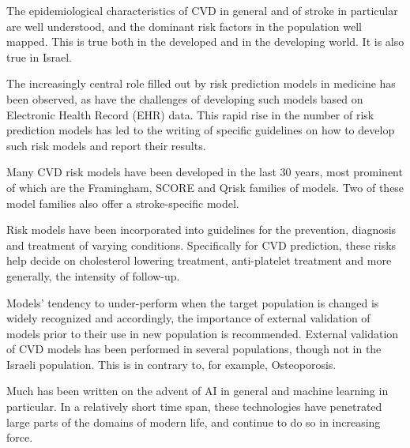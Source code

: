\documentclass[a4paper,12pt]{article}
\begin{document}
	The epidemiological characteristics of CVD in general and of stroke in particular are well understood\cite{Koton2014,Vangen-Loenne2017}, and the dominant risk factors in the population well mapped\cite{Yusuf2004,ODonnell2016}. This is true both in the developed and in the developing world\cite{Lozano2012}. It is also true in Israel\cite{ICDC2017}.
	
	The increasingly central role filled out by risk prediction models in medicine has been observed\cite{Moons2009}, as have the challenges of developing such models based on Electronic Health Record (EHR) data\cite{Goldstein2016,Goldstein2017}. This rapid rise in the number of risk prediction models has led to the writing of specific guidelines on how to develop such risk models and report their results\cite{Collins2015}.
	
	Many CVD risk models have been developed in the last 30 years, most prominent of which are the Framingham\cite{Wilson1998,NationalCholesterolEducationProgramNCEPExpertPanelonDetection2002,DAgostino2008,Goff2014}, SCORE\cite{Conroy2003} and Qrisk\cite{Hippisley-Cox2007,Hippisley-Cox2008} families of models.	Two of these model families also offer a stroke-specific model\cite{Wolf1991,DAgostino1994,Hippisley-Cox2013}.
	
	Risk models have been incorporated into guidelines for the prevention, diagnosis and treatment of varying conditions. Specifically for CVD prediction, these risks help decide on cholesterol lowering treatment, anti-platelet treatment and more generally, the intensity of follow-up\cite{NationalCholesterolEducationProgramNCEPExpertPanelonDetection2002,Graham2007,Goff2014,Bibbins-Domingo2016}.
	
	Models' tendency to under-perform when the target population is changed is widely recognized\cite{DAgostino2001,Bastuji-Garin2002,DeFilippis2015} and accordingly, the importance of external validation of models prior to their use in new population is recommended\cite{Moons2012}. External validation of CVD models has been performed in several populations\cite{DAgostino2001,Bastuji-Garin2002,DeFilippis2015}, though not in the Israeli population\cite{Bitzur2015}. This is in contrary to, for example, Osteoporosis\cite{Dagan2017}.
	
	Much has been written on the advent of AI in general and machine learning in particular. In a relatively short time span, these technologies have penetrated large parts of the domains of modern life, and continue to do so in increasing force\cite{Ng2017}.
	
\end{document}
